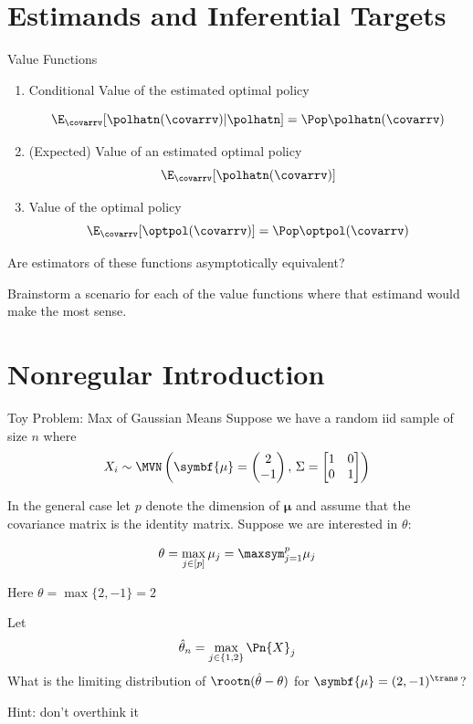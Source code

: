 \documentclass[aspectratio=169, professionalfonts]{beamer}
\begin{document}
\section{Estimands and Inferential Targets}

\begin{frame}{Value Functions}
	\begin{enumerate}
		\item Conditional Value of the estimated optimal policy

		      $$\E_{\covarrv}[\polhatn(\covarrv) \vert \polhatn] = \Pop \polhatn(\covarrv)$$

		\item (Expected) Value of an estimated optimal policy
		      $$\E_{\covarrv}[\polhatn(\covarrv)]$$

		\item Value of the optimal policy
		      $$\E_{\covarrv}[\optpol(\covarrv)] = \Pop \optpol(\covarrv)$$
	\end{enumerate}

	\vfill \pause

	Are estimators of these functions asymptotically equivalent?

	\vfill \pause
	Brainstorm a scenario for each of the value functions where that estimand would
	make the most sense.
\end{frame}

\section{Nonregular Introduction}
\begin{frame}{Toy Problem: Max of Gaussian Means}
	Suppose we have a random iid sample of size $n$ where
	\begin{equation*}
		X_i \sim \MVN \left(\symbf{\mu} = \begin{pmatrix}2 \\ -1 \end{pmatrix},\, \Sigma = \begin{bmatrix}1 & 0
               \\ 0 & 1\end{bmatrix} \right)
	\end{equation*}

	\vfill
	\pause

	In the general case let $p$ denote the dimension of $\symbf{\mu}$ and assume
	that the covariance matrix is the identity matrix. Suppose we are interested
	in $\theta$:

	$$\theta = \max_{j \in
			[p]} \mu_j = \maxsym_{j = 1}^{p} \mu_j$$
	\vfill

	Here $\theta = \max \{2, -1\} = 2$

	\vfill
	\pause
	Let $$\hat{\theta}_n = \max_{j \in \{1, 2 \}} \Pn {X}_j $$
	\vfill
	\pause
	What is the limiting distribution of $\rootn (\hat{\theta} - \theta)$ for $\symbf{\mu} =
		(2, -1 )^{\trans}$?

	Hint: don't overthink it
\end{frame}
\end{document}
